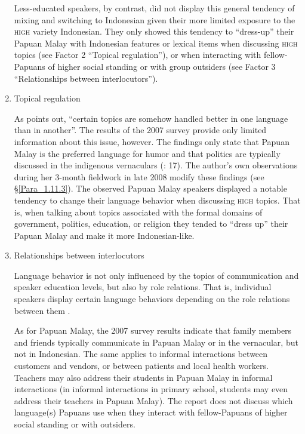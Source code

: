 \begin{enumerate}
Less-educated speakers, by contrast, did not display this general tendency of mixing and switching to Indonesian given their more limited exposure to the \textsc{high} variety Indonesian. They only showed this tendency to  ``dress-up'' their Papuan Malay with Indonesian features or lexical items when discussing \textsc{high} topics (see Factor 2 ``Topical regulation''), or when interacting with fellow-Papuans of higher social standing or with group outsiders (see Factor 3 ``Relationships between interlocutors'').


\item Topical regulation\label{Item_1.2}


As {\citet[71]{Fishman.1965}} points out,  ``certain topics are somehow handled better in one language than in another''. The results of the 2007 survey provide only limited information about this issue, however. The findings only state that Papuan Malay is the preferred language for humor and that politics are typically discussed in the indigenous vernaculars (\cite{Scott.2008}: 17). The author’s own observations during her 3-month fieldwork in late 2008 modify these findings (see §\ref{Para_1.11.3}). The observed Papuan Malay speakers displayed a notable tendency to change their language behavior when discussing \textsc{high} topics. That is, when talking about topics associated with the formal domains of government, politics, education, or religion they tended to ``dress up'' their Papuan Malay and make it more Indonesian-like.

\item Relationships between interlocutors\label{Item_1.3}

Language behavior is not only influenced by the topics of communication and speaker education levels, but also by role relations. That is, individual speakers display certain language behaviors depending on the role relations between them \citep[76]{Fishman.1965}.

As for Papuan Malay, the 2007 survey results \citep[13, 14]{Scott.2008} indicate that family members and friends typically communicate in Papuan Malay or in the vernacular, but not in Indonesian. The same applies to informal interactions between customers and vendors, or between patients and local health workers. Teachers may also address their students in Papuan Malay in informal interactions (in informal interactions in primary school, students may even address their teachers in Papuan Malay). The report does not discuss which language(s) Papuans use when they interact with fellow-Papuans of higher social standing or with outsiders.


\end{enumerate}
